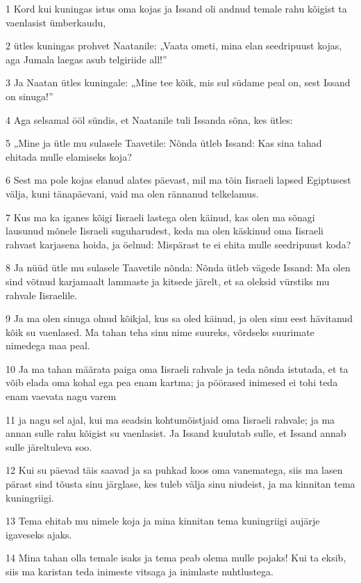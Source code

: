 \par 1 Kord kui kuningas istus oma kojas ja Issand oli andnud temale rahu kõigist ta vaenlasist ümberkaudu,
\par 2 ütles kuningas prohvet Naatanile: „Vaata ometi, mina elan seedripuust kojas, aga Jumala laegas asub telgiriide all!”
\par 3 Ja Naatan ütles kuningale: „Mine tee kõik, mis sul südame peal on, sest Issand on sinuga!”
\par 4 Aga selsamal ööl sündis, et Naatanile tuli Issanda sõna, kes ütles:
\par 5 „Mine ja ütle mu sulasele Taavetile: Nõnda ütleb Issand: Kas sina tahad ehitada mulle elamiseks koja?
\par 6 Sest ma pole kojas elanud alates päevast, mil ma tõin Iisraeli lapsed Egiptusest välja, kuni tänapäevani, vaid ma olen rännanud telkelamus.
\par 7 Kus ma ka iganes kõigi Iisraeli lastega olen käinud, kas olen ma sõnagi lausunud mõnele Iisraeli suguharudest, keda ma olen käskinud oma Iisraeli rahvast karjasena hoida, ja öelnud: Mispärast te ei ehita mulle seedripuust koda?
\par 8 Ja nüüd ütle mu sulasele Taavetile nõnda: Nõnda ütleb vägede Issand: Ma olen sind võtnud karjamaalt lammaste ja kitsede järelt, et sa oleksid vürstiks mu rahvale Iisraelile.
\par 9 Ja ma olen sinuga olnud kõikjal, kus sa oled käinud, ja olen sinu eest hävitanud kõik su vaenlased. Ma tahan teha sinu nime suureks, võrdseks suurimate nimedega maa peal.
\par 10 Ja ma tahan määrata paiga oma Iisraeli rahvale ja teda nõnda istutada, et ta võib elada oma kohal ega pea enam kartma; ja pöörased inimesed ei tohi teda enam vaevata nagu varem
\par 11 ja nagu sel ajal, kui ma seadsin kohtumõistjaid oma Iisraeli rahvale; ja ma annan sulle rahu kõigist su vaenlasist. Ja Issand kuulutab sulle, et Issand annab sulle järeltuleva soo.
\par 12 Kui su päevad täis saavad ja sa puhkad koos oma vanematega, siis ma lasen pärast sind tõusta sinu järglase, kes tuleb välja sinu niudeist, ja ma kinnitan tema kuningriigi.
\par 13 Tema ehitab mu nimele koja ja mina kinnitan tema kuningriigi aujärje igaveseks ajaks.
\par 14 Mina tahan olla temale isaks ja tema peab olema mulle pojaks! Kui ta eksib, siis ma karistan teda inimeste vitsaga ja inimlaste nuhtlustega.
